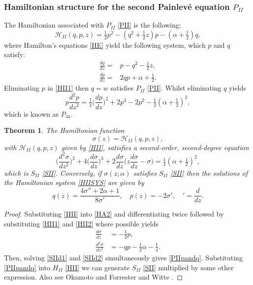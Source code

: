 \documentclass[12pt]{article}
\def\P{Painlev\'e }
\newtheorem{mydef}{Theorem}[section]
\numberwithin{figure}{section}
\numberwithin{equation}{section}
\numberwithin{table}{section}
\begin{document}
\subsubsection{Hamiltonian structure for the second \P equation  $P_{II}$}
The Hamiltonian associated with $P_{II}$ \eqref{PII} is the following:
\begin{equation}
\mathcal{H}_{II}(q,p,z) = \tfrac{1}{2}p^2-(q^2+\tfrac{1}{2}z)p-(\alpha+\tfrac{1}{2})q,\label{HII}
\end{equation}
where Hamilton's equations \eqref{HE} yield the following system, which $p$ and $q$ satisfy:
\begin{subequations}\label{HIISYS}
\begin{align}
\frac{dq}{dz}=&p-q^2-\tfrac{1}{2}z,\label{HII1}\\
\frac{dp}{dz}=&2qp+\alpha+\tfrac{1}{2}.\label{HII2}
\end{align}
\end{subequations}
Eliminating $p$ in \eqref{HII1} then $q=w$ satisfies $P_{II}$ \eqref{PII}. Whilst eliminating $q$ yields
\begin{equation}
p\frac{d^2p}{dz^2}=\tfrac{1}{2}\bigg(\frac{dp}{dz}\bigg)^2+2p^3-2p^2-\tfrac{1}{2}(\alpha+\tfrac{1}{2})^2,
\end{equation}
which is known as $P_{34}$.
\begin{mydef} The Hamiltonian function
\begin{equation}
\sigma(z)=\mathcal{H}_{II}(q,p,z),\label{HA2}
\end{equation}
with $\mathcal{H}_{II}(q,p,z)$ given by \eqref{HII}, satisfies a second-order, second-degree equation
$$
\bigg(\frac{d^2\sigma}{dz^2}\bigg)^2+4\bigg(\frac{d\sigma}{dz}\bigg)^3+2\frac{d\sigma}{dz}\bigg(z\frac{d\sigma}{dz}-\sigma\bigg)=\tfrac{1}{4}(\alpha+\tfrac{1}{2})^2,
$$
which is $S_{II}$ \eqref{SII}.
Conversely, if $\sigma(z;\alpha)$ satisfies $S_{II}$ \eqref{SII} then the solutions of the Hamiltonian system \eqref{HIISYS} are given by
\begin{equation}\label{PIIpandq}
q(z) =\frac{4\sigma''+2\alpha+1}{8\sigma'},\quad
p(z)=-2\sigma',\quad'=\frac{d}{dz}.
\end{equation}
\end{mydef}
\begin{proof}
Substituting \eqref{HII} into \eqref{HA2} and differentiating twice followed by substituting \eqref{HII1} and \eqref{HII2} where possible yields
\begin{subequations}
\begin{align}
\frac{d\sigma}{dz}&=-\tfrac{1}{2}p,\label{SIId1}\\
\frac{d^2\sigma}{dz^2}&=-qp-\tfrac{1}{2}\alpha-\tfrac{1}{4}.\label{SIId2}
\end{align}
\end{subequations}
Then, solving \eqref{SIId1} and \eqref{SIId2} simultaneously gives \eqref{PIIpandq}.
Substituting \eqref{PIIpandq} into $H_{II}$ \eqref{HII} we can generate $S_{II}$ \eqref{SII} multiplied by some other expression.
Also see Okamoto \cite{P:56:264,P:30:305} and Forrester and Witte \cite{P:57:679}.
\end{proof}
\end{document}
